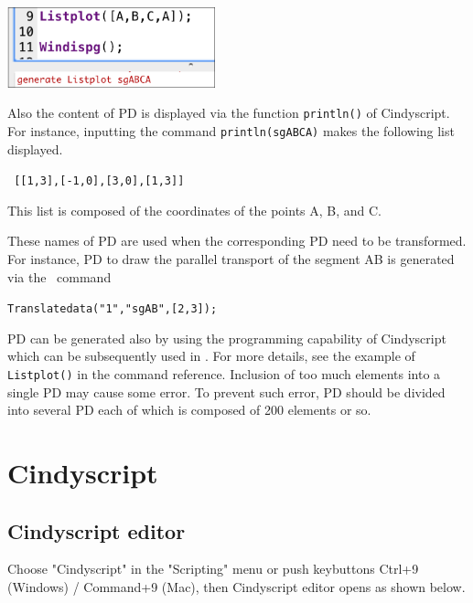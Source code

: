 \documentclass[papersize,a4paper,12pt]{article}
\begin{document}
\begin{center}
\includegraphics[bb=0.00 0.00 298.02 115.01,width=6cm]{Fig/pdtoconsole.pdf}
\end{center}
Also the content of PD is displayed 
via the function \verb|println()| of Cindyscript. 
For instance, inputting the command 
\verb|println(sgABCA)| makes the following list displayed. 
\begin{center}
\verb| [[1,3],[-1,0],[3,0],[1,3]] |
\end{center}
This list is composed of the coordinates of the points A, B, and C. 

These names of PD are used 
when the corresponding PD need to be transformed. 
For instance, 
PD to draw the parallel transport of the segment AB 
is generated via the \ketcindy\ command 
\begin{center}
\verb|Translatedata("1","sgAB",[2,3]);|
\end{center}

PD can be generated also 
by using the programming capability of Cindyscript 
which can be subsequently used in \ketcindy .  
For more details, 
see the example of \verb|Listplot()| 
in the command reference. 
Inclusion of too much elements into a single PD 
may cause some error. 
To prevent such error, 
PD should be divided into several PD 
each of which is composed of 200 elements or so. 


\newpage

\section{Cindyscript}

\subsection{Cindyscript editor}

Choose "Cindyscript" in the "Scripting" menu 
or push keybuttons Ctrl+9 (Windows) / Command+9 (Mac), 
then Cindyscript editor opens as shown below. 
\end{document}
